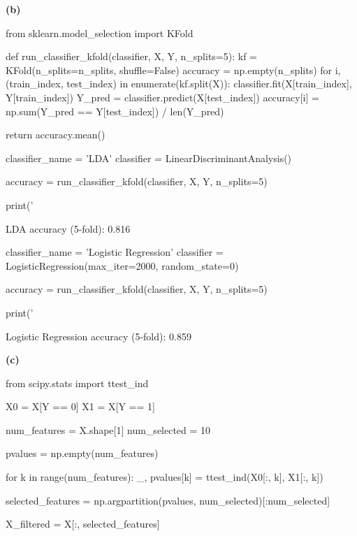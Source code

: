\textbf{(b)}

\begin{python}
from sklearn.model_selection import KFold

def run_classifier_{k}fold(classifier, X, Y, n_splits=5):
    kf = KFold(n_splits=n_splits, shuffle=False)
    accuracy = np.empty(n_splits)
    for i, (train_{i}ndex, test_{i}ndex) in enumerate(kf.split(X)):
        classifier.fit(X[train_{i}ndex], Y[train_{i}ndex])
        Y_pred = classifier.predict(X[test_{i}ndex])
        accuracy[i] = np.sum(Y_pred == Y[test_{i}ndex]) / len(Y_pred)
    
    return accuracy.mean()
\end{python}

\begin{python}
classifier_{n}ame = 'LDA'
classifier = LinearDiscriminantAnalysis()

accuracy = run_classifier_{k}fold(classifier, X, Y, n_splits=5)

print('%
\end{python}

\begin{console}
LDA accuracy (5-fold): 0.816
\end{console}

\begin{python}
classifier_{n}ame = 'Logistic Regression'
classifier = LogisticRegression(max_{i}ter=2000, random_state=0)

accuracy = run_classifier_{k}fold(classifier, X, Y, n_splits=5)

print('%
\end{python}

\begin{console}
Logistic Regression accuracy (5-fold): 0.859
\end{console}

\textbf{(c)}

\begin{python}
from scipy.stats import ttest_{i}nd

X0 = X[Y == 0]
X1 = X[Y == 1]

num_features = X.shape[1]
num_selected = 10

pvalues = np.empty(num_features)

for k in range(num_features):
    _, pvalues[k] = ttest_{i}nd(X0[:, k], X1[:, k])
    
selected_features = np.argpartition(pvalues, num_selected)[:num_selected]

X_filtered = X[:, selected_features]
\end{python}

